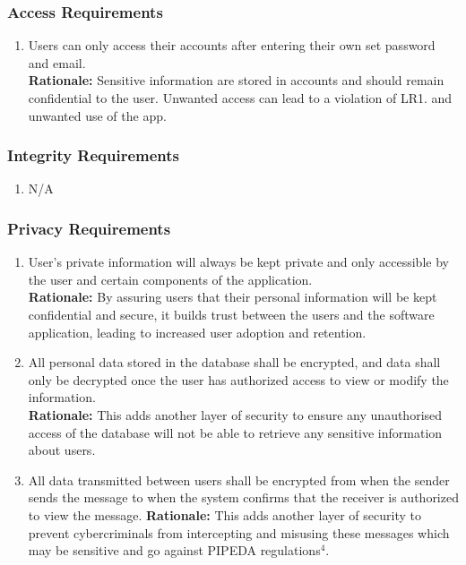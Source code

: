 \documentclass[]{article}
\begin{document}
\subsubsection{Access Requirements}
\label{ssub:access_requirements}
\begin{enumerate}[{SR-AC}1. ]
	\item Users can only access their accounts after entering their own set password and email.\\
	{\bf Rationale:} Sensitive information are stored in accounts and should remain confidential to the user. Unwanted access can lead to a violation of LR1. and unwanted use of the app. 
\end{enumerate}

\subsubsection{Integrity Requirements}
\label{ssub:integrity_requirements}
\begin{enumerate}[{SR-INT}1. ]
	\item N/A
\end{enumerate}

\subsubsection{Privacy Requirements}
\label{ssub:privacy_requirements}
\begin{enumerate}[{SR-P}1. ]
	\item User's private information will always be kept private and only accessible by the user and certain components of the application.\\
	{\bf Rationale:} By assuring users that their personal information will be kept confidential and secure, it builds trust between the users and the software application, leading to increased user adoption and retention. 
	\item All personal data stored in the database shall be encrypted, and data shall only be decrypted once the user has authorized access to view or modify the information.\\
	{\bf Rationale:} This adds another layer of security to ensure any unauthorised access of the database will not be able to retrieve any sensitive information about users. 
        \item All data transmitted between users shall be encrypted from when the sender sends the message to when the system confirms that the receiver is authorized to view the message.
        {\bf Rationale:} This adds another layer of security to prevent cybercriminals from intercepting and misusing these messages which may be sensitive and go against PIPEDA regulations$^4$.
\end{enumerate}
\end{document}
